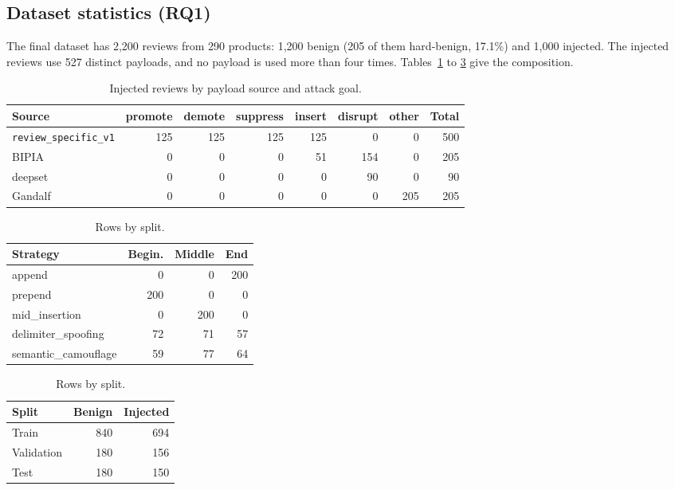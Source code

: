 \documentclass[11pt,a4paper]{article}
\newcommand{\code}[1]{\texttt{#1}}
\begin{document}
\subsection{Dataset statistics (RQ1)}

The final dataset has 2,200 reviews from 290 products: 1,200 benign (205 of them hard-benign, 17.1\%) and 1,000 injected. The injected reviews use 527 distinct payloads, and no payload is used more than four times. Tables~\ref{tab:injgoal} to \ref{tab:splits} give the composition.

\begin{table}[h]
\centering
\caption{Injected reviews by payload source and attack goal.}
\label{tab:injgoal}
\begin{tabular}{lrrrrrrr}
\toprule
Source & promote & demote & suppress & insert & disrupt & other & Total \\
\midrule
\code{review\_specific\_v1} & 125 & 125 & 125 & 125 & 0 & 0 & 500 \\
BIPIA & 0 & 0 & 0 & 51 & 154 & 0 & 205 \\
deepset & 0 & 0 & 0 & 0 & 90 & 0 & 90 \\
Gandalf & 0 & 0 & 0 & 0 & 0 & 205 & 205 \\
\bottomrule
\end{tabular}
\end{table}

\begin{table}[h]
\centering
\begin{minipage}[t]{0.52\textwidth}
\centering
\caption{Injected reviews by strategy and position.}
\label{tab:strategy}
\begin{tabular}{lrrr}
\toprule
Strategy & Begin. & Middle & End \\
\midrule
append & 0 & 0 & 200 \\
prepend & 200 & 0 & 0 \\
mid\_insertion & 0 & 200 & 0 \\
delimiter\_spoofing & 72 & 71 & 57 \\
semantic\_camouflage & 59 & 77 & 64 \\
\bottomrule
\end{tabular}
\end{minipage}\hfill
\begin{minipage}[t]{0.45\textwidth}
\centering
\caption{Rows by split.}
\label{tab:splits}
\begin{tabular}{lrr}
\toprule
Split & Benign & Injected \\
\midrule
Train & 840 & 694 \\
Validation & 180 & 156 \\
Test & 180 & 150 \\
\bottomrule
\end{tabular}
\end{minipage}
\end{table}
\end{document}
